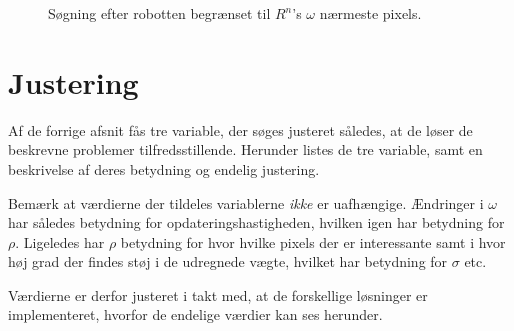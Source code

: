 \begin{figure}
\centering

\caption{Søgning efter robotten begrænset til $R^n$'s $\omega$ nærmeste pixels.}
\label{tracking:reduction}
\end{figure}

\section{Justering}\label{tracking:adjust}
Af de forrige afsnit fås tre variable, der søges justeret således, at de løser de beskrevne problemer tilfredsstillende.
Herunder listes de tre variable, samt en beskrivelse af deres betydning og endelig justering.

Bemærk at værdierne der tildeles variablerne \emph{ikke} er uafhængige.
Ændringer i $\omega$ har således betydning for opdateringshastigheden, hvilken igen har betydning for $\rho$.
Ligeledes har $\rho$ betydning for hvor hvilke pixels der er interessante samt i hvor høj grad der findes støj i de udregnede vægte, hvilket har betydning for $\sigma$ etc.

Værdierne er derfor justeret i takt med, at de forskellige løsninger er implementeret, hvorfor de endelige værdier kan ses herunder.

